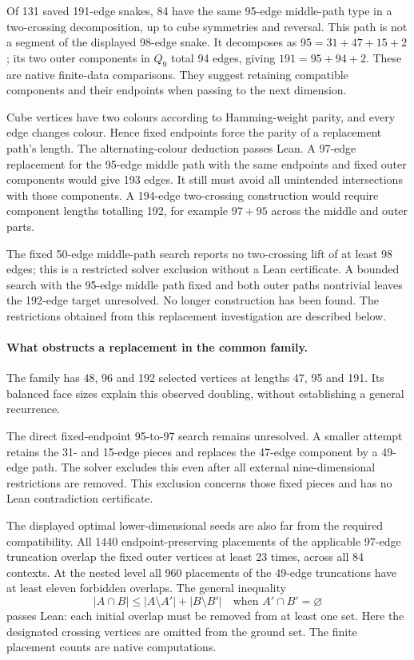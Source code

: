 \documentclass[11pt,a4paper]{article}
\begin{document}
Of 131 saved 191-edge snakes, 84 have the same 95-edge middle-path
type in a two-crossing decomposition, up to cube symmetries and
reversal. This path is not a segment of the displayed 98-edge snake.
It decomposes as $95=31+47+15+2$; its two outer components in $Q_9$
total 94 edges, giving $191=95+94+2$. These are native finite-data
comparisons. They suggest retaining compatible components and their
endpoints when passing to the next dimension.

Cube vertices have two colours according to Hamming-weight parity,
and every edge changes colour. Hence fixed endpoints force the parity
of a replacement path's length. The alternating-colour deduction
passes Lean. A 97-edge replacement for the 95-edge middle path with
the same endpoints and fixed outer components would give 193 edges.
It still must avoid all unintended intersections with those components.
A 194-edge two-crossing construction would require component lengths
totalling 192, for example $97+95$ across the middle and outer parts.

The fixed 50-edge middle-path search reports no two-crossing lift
of at least 98 edges; this is a restricted solver exclusion without
a Lean certificate. A bounded search with the 95-edge middle path
fixed and both outer paths nontrivial leaves the 192-edge target
unresolved. No longer construction has been found. The restrictions obtained from this replacement investigation are
described below.


\paragraph{What obstructs a replacement in the common family.}
The family has 48, 96 and 192 selected vertices at lengths 47, 95 and
191. Its balanced face sizes explain this observed doubling, without
establishing a general recurrence.

The direct fixed-endpoint 95-to-97 search remains unresolved. A smaller
attempt retains the 31- and 15-edge pieces and replaces the 47-edge
component by a 49-edge path. The solver excludes this even after all
external nine-dimensional restrictions are removed. This exclusion
concerns those fixed pieces and has no Lean contradiction certificate.

The displayed optimal lower-dimensional seeds are also far from the
required compatibility. All 1440 endpoint-preserving placements of
the applicable 97-edge truncation overlap the fixed outer vertices
at least 23 times, across all 84 contexts. At the nested level all
960 placements of the 49-edge truncations have at least eleven
forbidden overlaps. The general inequality
\[
|A\cap B|\le |A\setminus A'|+|B\setminus B'|
\quad\text{when }A'\cap B'=\varnothing
\]
passes Lean: each initial overlap must be removed from at least one
set. Here the designated crossing vertices are omitted from the ground
set. The finite placement counts are native computations.
\end{document}
